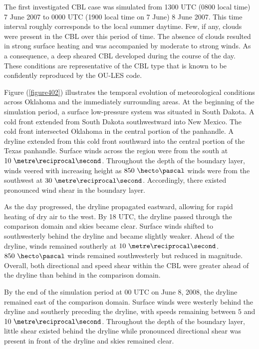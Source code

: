 The first investigated CBL case was simulated from 1300 UTC (0800 local time) 7 June 2007 to 0000 UTC (1900 local time on 7 June) 8 June 2007. This time interval roughly corresponds to the local summer daytime. Few, if any, clouds were present in the CBL over this period of time. The absence of clouds resulted in strong surface heating and was accompanied by moderate to strong winds. As a consequence, a deep sheared CBL developed during the course of the day. These conditions are representative of the CBL type that is known to be confidently reproduced by the OU-LES code. 

Figure (\autoref{figure402}) illustrates the temporal evolution of meteorological conditions across Oklahoma and the immediately surrounding areas. At the beginning of the simulation period, a surface low-pressure system was situated in South Dakota. A cold front extended from South Dakota southwestward into New Mexico. The cold front intersected Oklahoma in the central portion of the panhandle. A dryline extended from this cold front southward into the central portion of the Texas panhandle. Surface winds across the region were from the south at $10\mbox{ }\metre\reciprocal\second$. Throughout the depth of the boundary layer, winds veered with increasing height as $850\mbox{ }\hecto\pascal$ winds were from the southwest at $30\mbox{ }\metre\reciprocal\second$. Accordingly, there existed pronounced wind shear in the boundary layer. 

As the day progressed, the dryline propagated eastward, allowing for rapid heating of dry air to the west. By 18 UTC, the dryline passed through the comparison domain and skies became clear. Surface winds shifted to southwesterly behind the dryline and became slightly weaker. Ahead of the dryline, winds remained southerly at $10\mbox{ }\metre\reciprocal\second$. $850\mbox{ }\hecto\pascal$ winds remained southwesterly but reduced in magnitude. Overall, both directional and speed shear within the CBL were greater ahead of the dryline than behind in the comparison domain.

By the end of the simulation period at 00 UTC on June 8, 2008, the dryline remained east of the comparison domain. Surface winds were westerly behind the dryline and southerly preceding the dryline, with speeds remaining between $5$ and $10\mbox{ }\metre\reciprocal\second$. Throughout the depth of the boundary layer, little shear existed behind the dryline while pronounced directional shear was present in front of the dryline and skies remained clear.

